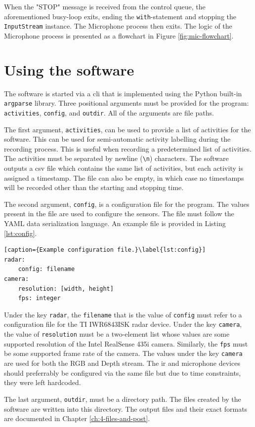 When the "STOP" message is received from the control queue,
the aforementioned busy-loop exits, ending the \texttt{with}-statement and stopping the \texttt{InputStream} instance.
The Microphone process then exits.
The logic of the Microphone process is presented as a flowchart in Figure \ref{fig:mic-flowchart}.

\section{Using the software}
\label{sec:3-usage}
The software is started via a \gls{cli} that is implemented using the Python built-in \texttt{argparse} library.
Three positional arguments must be provided for the program: \texttt{activities}, \texttt{config}, and \texttt{outdir}.
All of the arguments are file paths.

The first argument, \texttt{activities}, can be used to provide a list of activities for the software.
This can be used for semi-automatic activity labelling during the recording process.
This is useful when recording a predetermined list of activities.
The activities must be separated by newline (\texttt{\textbackslash n}) characters.
The software outputs a \gls{csv} file which contains the same list of activities,
but each activity is assigned a timestamp.
The file can also be empty, in which case no timestamps will be recorded other than the starting and stopping time.

The second argument, \texttt{config}, is a configuration file for the program.
The values present in the file are used to configure the sensors.
The file must follow the YAML data serialization language.
An example file is provided in Listing \ref{lst:config}.

\begin{lstlisting}[caption={Example configuration file.}\label{lst:config}]
radar:
    config: filename
camera:
    resolution: [width, height]
    fps: integer
\end{lstlisting}

Under the key \texttt{radar}, the \texttt{filename} that is the value of \texttt{config} must refer to a configuration file for the TI IWR6843ISK radar device.
Under the key \texttt{camera}, the value of \texttt{resolution} must be a two-element list whose values are some supported resolution of the Intel RealSense 435i camera.
Similarly, the \texttt{fps} must be some supported frame rate of the camera.
The values under the key \texttt{camera} are used for both the RGB and Depth stream.
The \gls{ir} and microphone devices should preferrably be configured via the same file but due to time constraints,
they were left hardcoded.

The last argument, \texttt{outdir}, must be a directory path.
The files created by the software are written into this directory.
The output files and their exact formats are documented in Chapter \ref{ch:4-files-and-post}.

